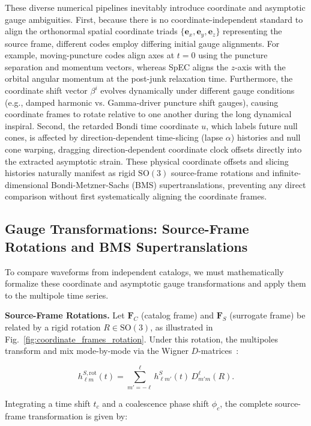 \documentclass[%
 reprint,
superscriptaddress,
 amsmath,amssymb,
 aps,
]{revtex4-2}
\begin{document}
These diverse numerical pipelines inevitably introduce coordinate and asymptotic gauge ambiguities. First, because there is no coordinate-independent standard to align the orthonormal spatial coordinate triads $\{\mathbf{e}_x, \mathbf{e}_y, \mathbf{e}_z\}$ representing the source frame, different codes employ differing initial gauge alignments. For example, moving-puncture codes align axes at $t=0$ using the puncture separation and momentum vectors, whereas SpEC aligns the $z$-axis with the orbital angular momentum at the post-junk relaxation time. Furthermore, the coordinate shift vector $\beta^i$ evolves dynamically under different gauge conditions (e.g., damped harmonic vs. Gamma-driver puncture shift gauges), causing coordinate frames to rotate relative to one another during the long dynamical inspiral. Second, the retarded Bondi time coordinate $u$, which labels future null cones, is affected by direction-dependent time-slicing (lapse $\alpha$) histories and null cone warping, dragging direction-dependent coordinate clock offsets directly into the extracted asymptotic strain. These physical coordinate offsets and slicing histories naturally manifest as rigid $\mathrm{SO}(3)$ source-frame rotations and infinite-dimensional Bondi-Metzner-Sachs (BMS) supertranslations, preventing any direct comparison without first systematically aligning the coordinate frames.

\subsection{Gauge Transformations: Source-Frame Rotations and BMS Supertranslations}

To compare waveforms from independent catalogs, we must mathematically formalize these coordinate and asymptotic gauge transformations and apply them to the multipole time series.

\textbf{Source-Frame Rotations.} Let $\mathbf{F}_C$ (catalog frame) and $\mathbf{F}_S$ (surrogate frame) be related by a rigid rotation $R \in \mathrm{SO}(3)$, as illustrated in Fig.~\ref{fig:coordinate_frames_rotation}. Under this rotation, the multipoles transform and mix mode-by-mode via the Wigner $D$-matrices~\cite{OShaughnessy:2012iol}:

\begin{equation}h^{S,\mathrm{rot}}_{\ell m}(t) = \sum_{m'=-\ell}^{\ell} h^S_{\ell m'}(t)\, D^\ell_{m' m}(R).\end{equation}

Integrating a time shift $t_c$ and a coalescence phase shift $\phi_c$, the complete source-frame transformation is given by:
\end{document}
